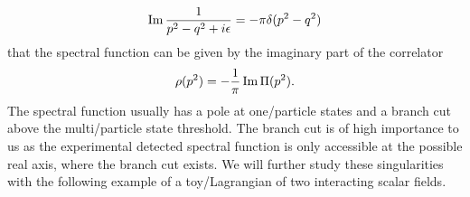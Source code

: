 \documentclass[../../index.tex]{subfiles}
\begin{document}
\begin{equation}
  \label{eq:cuttingRules}
  \operatorname{Im} \frac{1}{p^2-q^2+i\epsilon} = -\pi \delta(p^2-q^2)
\end{equation}
that the spectral function can be given by the imaginary part of the correlator
\begin{equation}
  \rho(p^2) = -\frac{1}{\pi} \operatorname{Im}\Pi(p^2).
\end{equation}
The spectral function usually has a pole at one\-/particle states and a branch
cut above the multi\-/particle state threshold. The branch cut is of high
importance to us as the experimental detected spectral function is only
accessible at the possible real axis, where the branch cut exists. We will
further study these singularities with the following example of a
toy\-/Lagrangian of two interacting scalar fields.
\end{document}

